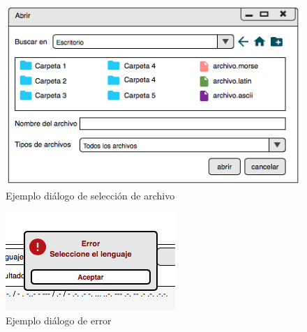 \documentclass[a4paper,10pt]{article}
\theoremstyle{mytheor}
\begin{document}
\begin{figure}[H]
    \begin{center}
        \caption{Ejemplo di\'alogo de selecci\'on de archivo}\label{fig:v2}
        \includegraphics[scale=.65]{v2.png}
    \end{center}
\end{figure}

\begin{figure}[H]
    \begin{center}
        \caption{Ejemplo di\'alogo de error}\label{fig:v3}
        \includegraphics[scale=.65]{v3.png}
    \end{center}
\end{figure}
\end{document}
